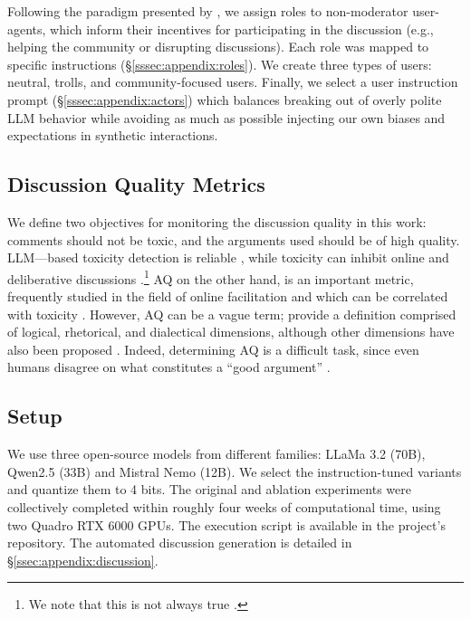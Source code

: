 Following the paradigm presented by \citet{abdelnabi_negotiations}, we assign roles to non-moderator user-agents, which inform their incentives for participating in the discussion (e.g., helping the community or disrupting discussions). Each role was mapped to specific instructions (\S\ref{sssec:appendix:roles}). We create three types of users: neutral, trolls, and community-focused users. Finally, we select a user instruction prompt (\S\ref{sssec:appendix:actors}) which balances breaking out of overly polite \ac{LLM} behavior while avoiding as much as possible injecting our own biases and expectations in synthetic interactions. 


\subsection{Discussion Quality Metrics}
\label{ssec:experimental:metrics}

We define two objectives for monitoring the discussion quality in this work: comments should not be toxic, and the arguments used should be of high quality. \ac{LLM}—based toxicity detection is reliable \citep{kang-qian-2024-implanting, Wang2022ToxicityDW, anjum2024hate}, while toxicity can inhibit online and deliberative discussions \citep{dekock2022disagree, XiaToxicity}.\footnote{We note that this is not always true \citep{Avalle2024PersistentIP}.} 
\ac{AQ} on the other hand, is an important metric, frequently studied in the field of online facilitation \cite{argyle2023, schroeder-etal-2024-fora, falk-etal-2024-moderation, falk-etal-2021-predicting} and which can be correlated with toxicity \cite{chang-danescu-niculescu-mizil-2019-trouble}. However, \ac{AQ} can be a vague term; \citet{wachsmuth-etal-2017-computational} provide a definition comprised of logical, rhetorical, and dialectical dimensions, although other dimensions have also been proposed \cite{habernal-gurevych-2016-argument, persing-ng-2015-modeling}. Indeed, determining \ac{AQ} is a difficult task, since even humans disagree on what constitutes a ``good argument” \cite{wachsmuth-etal-2017-computational, argyle2023}. 

\subsection{Setup}
\label{ssec:experimental:setup}

We use three open-source models from different families: LLaMa 3.2 (70B), Qwen2.5 (33B) and Mistral Nemo (12B). We select the instruction-tuned variants and quantize them to 4 bits. The original and ablation experiments were collectively completed within roughly four weeks of computational time, using two Quadro RTX 6000 GPUs. The execution script is available in the project's repository\analysislink. The automated discussion generation is detailed in \S\ref{ssec:appendix:discussion}.

